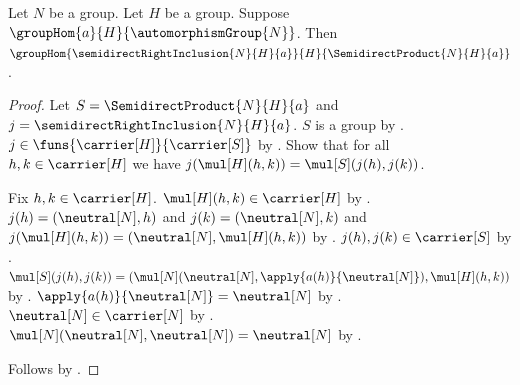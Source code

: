 \begin{theorem}\label{semidirect_right_inclusion_hom}
    Let $N$ be a group.
    Let $H$ be a group.
    Suppose $\groupHom{a}{H}{\automorphismGroup{N}}$.
    Then
        $\groupHom{\semidirectRightInclusion{N}{H}{a}}
            {H}{\SemidirectProduct{N}{H}{a}}$.
\end{theorem}
\begin{proof}
    Let $S=\SemidirectProduct{N}{H}{a}$ and
        $j=\semidirectRightInclusion{N}{H}{a}$.
    $S$ is a group by .
    $j\in\funs{\carrier[H]}{\carrier[S]}$ by
        .
    Show that for all $h,k\in\carrier[H]$ we have
        $j(\mul[H](h,k))=\mul[S](j(h),j(k))$.
    \begin{subproof}
        Fix $h,k\in\carrier[H]$.
        $\mul[H](h,k)\in\carrier[H]$ by
            .
        $j(h)=(\neutral[N],h)$ and
            $j(k)=(\neutral[N],k)$ and
            $j(\mul[H](h,k))=(\neutral[N],\mul[H](h,k))$ by
            .
        $j(h),j(k)\in\carrier[S]$ by
            .
        $\mul[S](j(h),j(k))=
            (\mul[N](\neutral[N],
                \apply{a(h)}{\neutral[N]}),
             \mul[H](h,k))$ by
            .
        $\apply{a(h)}{\neutral[N]}=\neutral[N]$ by
            .
        $\neutral[N]\in\carrier[N]$ by
            .
        $\mul[N](\neutral[N],\neutral[N])=\neutral[N]$ by
            .
    \end{subproof}
    Follows by .
\end{proof}

